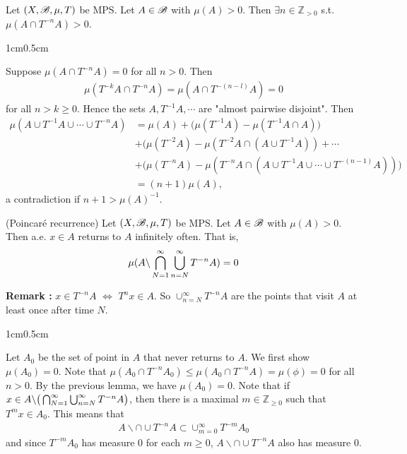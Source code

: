 \documentclass[10pt,a4paper]{report}
\newenvironment{proof}
{\begin{changemargin}{1cm}{0.5cm} 
	}%
	{\end{changemargin}
}
\begin{document}
\lem Let $(X, \mathscr{B}, \mu, T)$ be MPS. Let $A\in \mathscr{B}$ with $\mu(A) >0$. Then $\exists n \in \mathbb{Z}_{>0}$ s.t. $\mu(A \cap T^{-n}A) >0$.
\begin{proof}
\pf Suppose $\mu(A \cap T^{-n}A) =0$ for all $n>0$. Then
\begin{align*}
\mu(T^{-k}A\cap T^{-n}A) = \mu(A \cap T^{-(n-l)}A ) =0
\end{align*}
for all $n>k\geq 0$. Hence the sets $A, T^{-1}A,\cdots$ are "almost pairwise disjoint". Then
\begin{align*}
\mu(A \cup T^{-1}A \cup \cdots \cup T^{-n}A) &= \mu(A) + \big( \mu(T^{-1}A) - \mu(T^{-1}A \cap A) \big)\\
& + \big( \mu(T^{-2}A) - \mu(T^{-2}A \cap (A \cup T^{-1}A)) + \cdots \\
& + \big( \mu(T^{-n}A) - \mu(T^{-n}A \cap (A \cup T^{-1}A \cup \cdots \cup T^{-(n-1)}A) ) \big) \\
& = (n+1) \mu(A),
\end{align*}
a contradiction if $n+1 > \mu(A)^{-1}$.

\eop
\end{proof}
\s

\thm (Poincar\'{e} recurrence) Let $(X,\mathscr{B}, \mu, T)$ be MPS. Let $A \in \mathscr{B}$ with $\mu(A) >0$. Then a.e. $x\in A$ returns to $A$ infinitely often. That is,
\begin{align*}
\mu(A \backslash \bigcap_{N=1}^{\infty}\bigcup_{n=N}^{\infty} T^{-n} A  ) =0
\end{align*}
\s

\textbf{Remark : } $x\in T^{-n} A$ $\Leftrightarrow$ $T^{n}x \in A$. So $\cup_{n=N}^{\infty} T^{-n}A$ are the points that visit $A$ at least once after time $N$. 
\s

\begin{proof}
\pf Let $A_0$ be the set of point in $A$ that never returns to $A$. We first show $\mu(A_0)=0$. Note that $\mu(A_0 \cap T^{-n}A_0) \leq \mu(A_0 \cap T^{-n}A) = \mu(\phi) =0$ for all $n>0$. By the previous lemma, we have $\mu(A_0) =0$. Note that if $x\in A \backslash \big( \bigcap_{N=1}^{\infty}\bigcup_{n=N}^{\infty} T^{-n} A \big)$, then there is a maximal $m\in \mathbb{Z}_{\geq 0}$ such that $T^{m}x \in A_0$. This means that
\begin{align*}
A \backslash \cap \cup T^{-n} A \subset \cup_{m=0}^{\infty}T^{-m}A_0
\end{align*}
and since $T^{-m} A_0$ has measure 0 for each $m\geq 0$, $A \backslash \cap \cup T^{-n} A$ also has measure 0.

\eop
\end{proof}
\s
\end{document}
